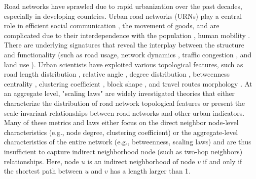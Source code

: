 \documentclass[10pt]{wlscirep}
\begin{document}
Road networks have sprawled due to rapid urbanization over the past decades, especially in developing countries. Urban road networks (URNs) play a central role in efficient social communication \cite{sun2013understanding,roth2011structure}, the movement of goods\cite{steadieseifi2014multimodal}, and are complicated due to their interdependence with the population \cite{bettencourt2007growth, arcaute2015constructing}, human mobility \cite{xu2020deconstructing,snellen2002urban}.
There are underlying signatures that reveal the interplay between the structure and functionality (such as road usage\cite{wang2012understanding}, network dynamics \cite{zhan2017dynamics,li2015percolation}, traffic congestion \cite{saberi2020simple,ccolak2016understanding,zhang2019scale}, and land use \cite{foley2005global}). Urban scientists have exploited various topological features, such as road length distribution \cite{strano2017scaling}, relative angle \cite{molinero2017angular}, degree distribution \cite{kalapala2006scale,porta2006network}, betweenness centrality \cite{crucitti2006centrality,kirkley2018betweenness}, clustering coefficient \cite{jiang2004topological}, block shape \cite{louf2014typology}, and travel routes morphology \cite{lee2017morphology}. At an aggregate level, "scaling laws" are widely investigated theories that either characterize the distribution of road network topological features\cite{strano2017scaling,kalapala2006scale,zhan2017dynamics} or present the scale-invariant relationships between road networks and other urban indicators\cite{masucci2015problem,lammer2006scaling,bettencourt2007growth,depersin2018global}. Many of these metrics and laws either focus on the direct neighbor node-level characteristics (e.g., node degree, clustering coefficient) or the aggregate-level characteristics of the entire network (e.g., betweenness, scaling laws) and are thus insufficient to capture indirect neighborhood node (such as two-hop neighbors) relationships. Here, node $u$ is an indirect neighborhood of node $v$ if and only if the shortest path between $u$ and $v$ has a length larger than 1.
\end{document}
